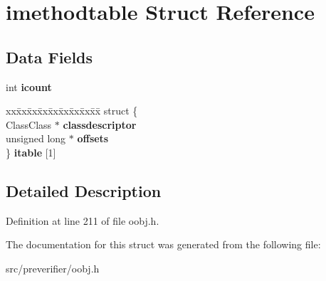 \section{imethodtable Struct Reference}
\label{structimethodtable}
\subsection*{Data Fields}
\begin{DoxyCompactItemize}
\item 
int {\bfseries icount}\label{structimethodtable_a315969d97bcb9919404b3d3d793d6c2a}

\item 
\begin{tabbing}
xx\=xx\=xx\=xx\=xx\=xx\=xx\=xx\=xx\=\kill
struct \{\\
\>ClassClass $\ast$ {\bfseries classdescriptor}\\
\>unsigned long $\ast$ {\bfseries offsets}\\
\} {\bfseries itable} [1]\label{structimethodtable_a5dad6cfb42f7469a02bada68161fe109}
\\

\end{tabbing}\end{DoxyCompactItemize}


\subsection{Detailed Description}


Definition at line 211 of file oobj.h.



The documentation for this struct was generated from the following file:\begin{DoxyCompactItemize}
\item 
src/preverifier/oobj.h\end{DoxyCompactItemize}
